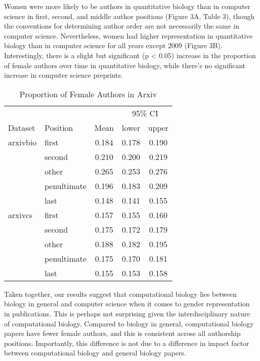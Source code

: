 \documentclass[10pt,letterpaper]{article}
\begin{document}
\begin{flushleft}
Women were more likely to be authors in quantitative biology than in computer science in first, second, and middle author positions (Figure 3A, Table 3), though the conventions for determining author order are not necessarily the same in computer science. Nevertheless, women had higher representation in quantitative biology than in computer science for all years except 2009 (Figure 3B). Interestingly, there is a slight but significant (p < 0.05) increase in the proportion of female authors over time in quantitative biology, while there’s no significant increase in computer science preprints.

\begin{table}[]
\centering
\caption{Proportion of Female Authors in Arxiv}
\label{Table 3}
\begin{tabular}{llccc}
\toprule
        &                  &       & \multicolumn{2}{c}{95\% CI} \\
\cmidrule(r){4-5}
Dataset      & Position    & Mean  & lower        & upper        \\
\midrule
arxivbio     & first       & 0.184 & 0.178        & 0.190        \\
             & second      & 0.210 & 0.200        & 0.219        \\
             & other       & 0.265 & 0.253        & 0.276        \\
             & penultimate & 0.196 & 0.183        & 0.209        \\
             & last        & 0.148 & 0.141        & 0.155        \\
arxivcs      & first       & 0.157 & 0.155        & 0.160        \\
             & second      & 0.175 & 0.172        & 0.179        \\
             & other       & 0.188 & 0.182        & 0.195        \\
             & penultimate & 0.175 & 0.170        & 0.181        \\
             & last        & 0.155 & 0.153        & 0.158        \\
\bottomrule
\end{tabular}
\end{table}

Taken together, our results suggest that computational biology lies between biology in general and computer science when it comes to gender representation in publications. This is perhaps not surprising given the interdisciplinary nature of computational biology. Compared to biology in general, computational biology papers have fewer female authors, and this is consistent across all authorship positions. Importantly, this difference is not due to a difference in impact factor between computational biology and general biology papers.


\end{flushleft}
\end{document}
